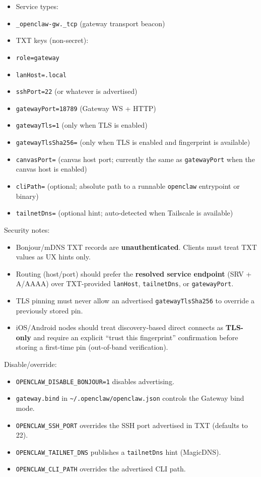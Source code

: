 \begin{itemize}
  \item Service types:
  \item \texttt{\_openclaw-gw.\_tcp} (gateway transport beacon)
  \item TXT keys (non-secret):
  \item \texttt{role=gateway}
  \item \texttt{lanHost=.local}
  \item \texttt{sshPort=22} (or whatever is advertised)
  \item \texttt{gatewayPort=18789} (Gateway WS + HTTP)
  \item \texttt{gatewayTls=1} (only when TLS is enabled)
  \item \texttt{gatewayTlsSha256=} (only when TLS is enabled and fingerprint is available)
  \item \texttt{canvasPort=} (canvas host port; currently the same as \texttt{gatewayPort} when the canvas host is enabled)
  \item \texttt{cliPath=} (optional; absolute path to a runnable \texttt{openclaw} entrypoint or binary)
  \item \texttt{tailnetDns=} (optional hint; auto-detected when Tailscale is available)
\end{itemize}


Security notes:

\begin{itemize}
  \item Bonjour/mDNS TXT records are \textbf{unauthenticated}. Clients must treat TXT values as UX hints only.
  \item Routing (host/port) should prefer the \textbf{resolved service endpoint} (SRV + A/AAAA) over TXT-provided \texttt{lanHost}, \texttt{tailnetDns}, or \texttt{gatewayPort}.
  \item TLS pinning must never allow an advertised \texttt{gatewayTlsSha256} to override a previously stored pin.
  \item iOS/Android nodes should treat discovery-based direct connects as \textbf{TLS-only} and require an explicit “trust this fingerprint” confirmation before storing a first-time pin (out-of-band verification).
\end{itemize}


Disable/override:

\begin{itemize}
  \item \texttt{OPENCLAW\_DISABLE\_BONJOUR=1} disables advertising.
  \item \texttt{gateway.bind} in \texttt{\textasciitilde{}/.openclaw/openclaw.json} controls the Gateway bind mode.
  \item \texttt{OPENCLAW\_SSH\_PORT} overrides the SSH port advertised in TXT (defaults to 22).
  \item \texttt{OPENCLAW\_TAILNET\_DNS} publishes a \texttt{tailnetDns} hint (MagicDNS).
  \item \texttt{OPENCLAW\_CLI\_PATH} overrides the advertised CLI path.
\end{itemize}


